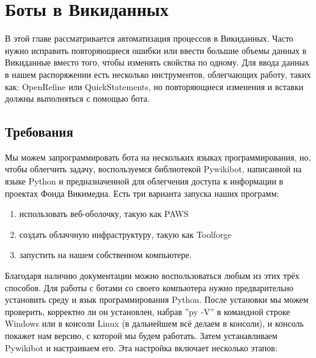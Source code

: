 \chapter{Боты в Викиданных}
\label{ch:bots}
В этой главе рассматривается автоматизация процессов в Викиданных. Часто нужно исправить повторяющиеся ошибки или ввести большие объемы данных в Викиданные вместо того, чтобы изменять свойства по одному. Для ввода данных в нашем распоряжении есть несколько инструментов, облегчающих работу, таких как: OpenRefine или QuickStatements, но повторяющиеся изменения и вставки должны выполняться с помощью бота.

\section{Требования}
\label{sec:requirements}
Мы можем запрограммировать бота на нескольких языках программирования, но, чтобы облегчить задачу, воспользуемся библиотекой Pywikibot, написанной на языке Python и предназначенной для облегчения доступа к информации в проектах Фонда Викимедиа. Есть три варианта запуска наших программ:
\begin{enumerate}
  \setlength{\itemindent}{2em}
  \item использовать веб-оболочку, такую как PAWS
  \item создать облаччную инфраструктуру, такую как Toolforge
  \item запустить на нашем собственном компьютере.
\end{enumerate}

Благодаря наличию документации можно воспользоваться любым из этих трёх способов. Для работы с ботами со своего компьютера нужно предварительно установить среду и язык программирования Python. После установки мы можем проверить, корректно ли он установлен, набрав ''py -V'' в командной строке Windows или в консоли Linux (в дальнейшем всё делаем в консоли), и консоль покажет нам версию, с которой мы будем работать. Затем устанавливаем Pywikibot и настраиваем его. Эта настройка включает несколько этапов:


